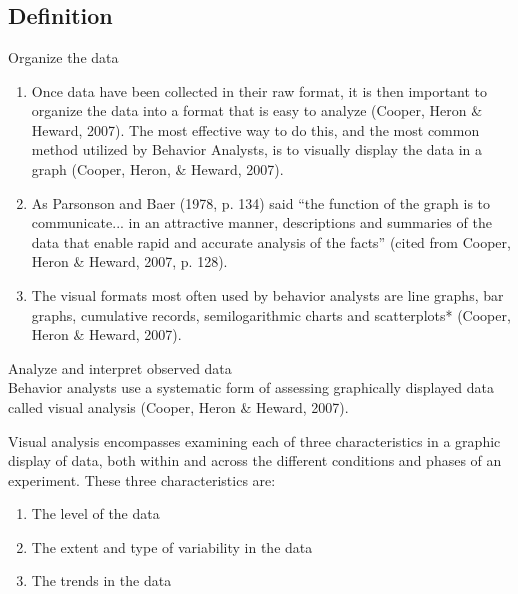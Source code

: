 \clearpage \section[\fouriFive{}]{\fouriFive{}%
              }
\clearpage \section{\fouriFive{}}
\subsection{Definition}
Organize the data
\begin{enumerate}
\item Once data have been collected in their raw format, it is then important to organize the data into a format that is easy to analyze (Cooper, Heron \& Heward, 2007). The most effective way to do this, and the most common method utilized by Behavior Analysts, is to visually display the data in a graph (Cooper, Heron, \& Heward, 2007).
\item As Parsonson and Baer (1978, p. 134) said ``the function of the graph is to communicate... in an attractive manner, descriptions and summaries of the data that enable rapid and accurate analysis of the facts'' (cited from Cooper, Heron \& Heward, 2007, p. 128).
\item The visual formats most often used by behavior analysts are line graphs, bar graphs, cumulative records, semilogarithmic charts and scatterplots* (Cooper, Heron \& Heward, 2007).
\end{enumerate}
%
Analyze and interpret observed data\\

Behavior analysts use a systematic form of assessing graphically displayed data called visual analysis (Cooper, Heron \& Heward, 2007). 

Visual analysis encompasses examining each of three characteristics in a graphic display of data, both within and across the different conditions and phases of an experiment. These three characteristics are:

\begin{enumerate}
\item The level of the data
\item The extent and type of variability in the data 
\item The trends in the data
\end{enumerate}

